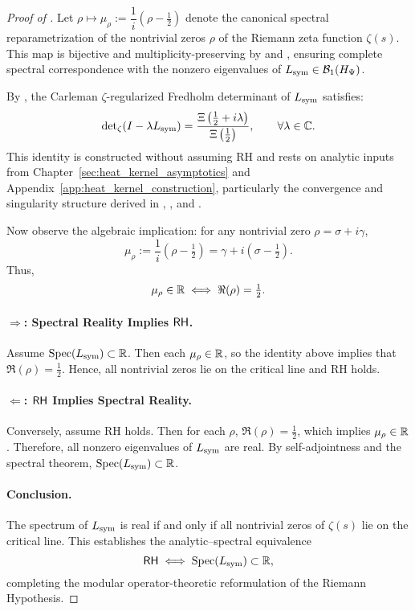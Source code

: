 \begin{proof}[Proof of ]
Let \( \rho \mapsto \mu_\rho := \dfrac{1}{i}(\rho - \tfrac{1}{2}) \) denote the canonical spectral reparametrization of the nontrivial zeros \( \rho \) of the Riemann zeta function \( \zeta(s) \). This map is bijective and multiplicity-preserving by  and , ensuring complete spectral correspondence with the nonzero eigenvalues of \( L_{\mathrm{sym}} \in \mathcal{B}_1(H_{\Psi}) \).

\medskip

By , the Carleman \(\zeta\)-regularized Fredholm determinant of \( L_{\mathrm{sym}} \) satisfies:
\[
\det\nolimits_{\zeta}(I - \lambda L_{\mathrm{sym}}) = \frac{\Xi\left( \tfrac{1}{2} + i\lambda \right)}{\Xi\left( \tfrac{1}{2} \right)},
\qquad \forall \lambda \in \mathbb{C}.
\]
This identity is constructed without assuming RH and rests on analytic inputs from Chapter~\ref{sec:heat_kernel_asymptotics} and Appendix~\ref{app:heat_kernel_construction}, particularly the convergence and singularity structure derived in , , and .

\medskip

Now observe the algebraic implication: for any nontrivial zero \( \rho = \sigma + i\gamma \),
\[
\mu_\rho := \frac{1}{i}(\rho - \tfrac{1}{2}) = \gamma + i(\sigma - \tfrac{1}{2}).
\]
Thus,
\[
\mu_\rho \in \mathbb{R} \iff \Re(\rho) = \tfrac{1}{2}.
\]

\paragraph*{\( \Rightarrow \): Spectral Reality Implies \(\mathsf{RH}\).}
Assume \( \operatorname{Spec}(L_{\mathrm{sym}}) \subset \mathbb{R} \). Then each \( \mu_\rho \in \mathbb{R} \), so the identity above implies that \( \Re(\rho) = \tfrac{1}{2} \). Hence, all nontrivial zeros lie on the critical line and RH holds.

\paragraph*{\( \Leftarrow \): \(\mathsf{RH}\) Implies Spectral Reality.}
Conversely, assume RH holds. Then for each \( \rho \), \( \Re(\rho) = \tfrac{1}{2} \), which implies \( \mu_\rho \in \mathbb{R} \). Therefore, all nonzero eigenvalues of \( L_{\mathrm{sym}} \) are real. By self-adjointness and the spectral theorem, \( \operatorname{Spec}(L_{\mathrm{sym}}) \subset \mathbb{R} \).

\paragraph*{Conclusion.}
The spectrum of \( L_{\mathrm{sym}} \) is real if and only if all nontrivial zeros of \( \zeta(s) \) lie on the critical line. This establishes the analytic–spectral equivalence
\[
\mathsf{RH} \iff \operatorname{Spec}(L_{\mathrm{sym}}) \subset \mathbb{R},
\]
completing the modular operator-theoretic reformulation of the Riemann Hypothesis.
\end{proof}
